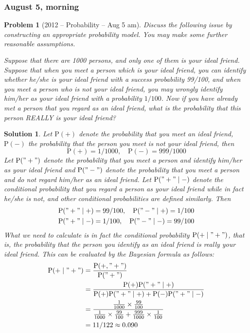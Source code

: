 \documentclass[12pt]{amsart}
\newtheorem{problem}{Problem}
\newtheorem*{solution}{Solution}
\begin{document}
\subsubsection*{August 5, morning}
\begin{problem}[2012 -- Probability -- Aug 5 am]
Discuss the following issue by constructing an appropriate probability model. You may make some further reasonable assumptions.

Suppose that there are 1000 persons, and only one of them is your ideal friend. Suppose that when you meet a person which is your ideal friend, you can identify whether he/she is your ideal friend with a success probability 99/100, and when you meet a person who is not your ideal friend, you may wrongly identify him/her as your ideal friend with a probability $1 / 100$. Now if you have already met a person that you regard as an ideal friend, what is the probability that this person REALLY is your ideal friend?
\end{problem}
\begin{solution}
Let $\mathrm{P}(+)$ denote the probability that you meet an ideal friend, $\mathrm{P}(-)$ the probability that the person you meet is not your ideal friend, then
$$
\mathrm{P}(+)=1 / 1000, \quad \mathrm{P}(-)=999 / 1000
$$
Let $\mathrm{P}(" + ")$ denote the probability that you meet a person and identify him/her as your ideal friend and $\mathrm{P}(" - ")$ denote the probability that you meet a person and do not regard him/her as an ideal friend. Let $\mathrm{P}("+" \mid-)$ denote the conditional probability that you regard a person as your ideal friend while in fact he/she is not, and other conditional probabilities are defined similarly. Then
\begin{align*}
& \mathrm{P}("+" \mid+)=99 / 100, \quad \mathrm{P}("-" \mid+)=1 / 100 \\
& \mathrm{P}("+" \mid-)=1 / 100, \quad \mathrm{P}("-" \mid-)=99 / 100
\end{align*}
What we need to calculate is in fact the conditional probability $\mathrm{P}(+\mid " + ")$, that is, the probability that the person you identify as an ideal friend is really your ideal friend. This can be evaluated by the Bayesian formula as follows:
\begin{align*}
\mathrm{P}(+\mid" + ") & =\frac{\mathrm{P}(+, "+")}{\mathrm{P}(" + ")} \\
& =\frac{\mathrm{P}(+) \mathrm{P}("+" \mid+)}{\mathrm{P}(+) \mathrm{P}("+" \mid+)+\mathrm{P}(-) \mathrm{P}("+" \mid-)} \\
& =\frac{\frac{1}{1000} \times \frac{99}{100}}{\frac{1}{1000} \times \frac{99}{100}+\frac{999}{1000} \times \frac{1}{100}} \\
& =11 / 122 \approx 0.090
\end{align*}
\end{solution}
\end{document}
